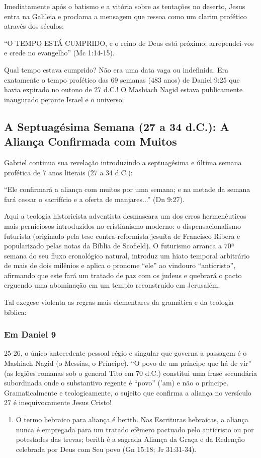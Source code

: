 \documentclass[11pt,a4paper,openany]{book}
\begin{document}
Imediatamente após o batismo e a vitória sobre as tentações no deserto, Jesus entra na Galileia e proclama a mensagem que ressoa como um clarim profético através dos séculos:

``O TEMPO ESTÁ CUMPRIDO, e o reino de Deus está próximo; arrependei-vos e crede no evangelho'' (Mc 1:14-15).

Qual tempo estava cumprido? Não era uma data vaga ou indefinida. Era exatamente o tempo profético das 69 semanas (483 anos) de Daniel 9:25 que havia expirado no outono de 27 d.C.! O Mashiach Nagid estava publicamente inaugurado perante Israel e o universo.



\subsection{A Septuagésima Semana (27 a 34 d.C.): A Aliança Confirmada com Muitos}


Gabriel continua sua revelação introduzindo a septuagésima e última semana profética de 7 anos literais (27 a 34 d.C.):

``Ele confirmará a aliança com muitos por uma semana; e na metade da semana fará cessar o sacrifício e a oferta de manjares...'' (Dn 9:27).

Aqui a teologia historicista adventista desmascara um dos erros hermenêuticos mais perniciosos introduzidos no cristianismo moderno: o dispensacionalismo futurista (originado pela tese contra-reformista jesuíta de Francisco Ribera e popularizado pelas notas da Bíblia de Scofield). O futurismo arranca a 70ª semana do seu fluxo cronológico natural, introduz um hiato temporal arbitrário de mais de dois milênios e aplica o pronome ``ele'' ao vindouro ``anticristo'', afirmando que este fará um tratado de paz com os judeus e quebrará o pacto erguendo uma abominação em um templo reconstruído em Jerusalém.

Tal exegese violenta as regras mais elementares da gramática e da teologia bíblica:

\subsubsection*{Em Daniel 9}
25-26, o único antecedente pessoal régio e singular que governa a passagem é o Mashiach Nagid (o Messias, o Príncipe). ``O povo de um príncipe que há de vir'' (as legiões romanas sob o general Tito em 70 d.C.) constitui uma frase secundária subordinada onde o substantivo regente é ``povo'' ('am) e não o príncipe. Gramaticalmente e teologicamente, o sujeito que confirma a aliança no versículo 27 é inequivocamente Jesus Cristo!
\begin{enumerate}
  \item O termo hebraico para aliança é berith. Nas Escrituras hebraicas, a aliança nunca é empregada para um tratado efêmero pactuado pelo anticristo ou por potestades das trevas; berith é a sagrada Aliança da Graça e da Redenção celebrada por Deus com Seu povo (Gn 15:18; Jr 31:31-34).
\end{enumerate}
\end{document}
